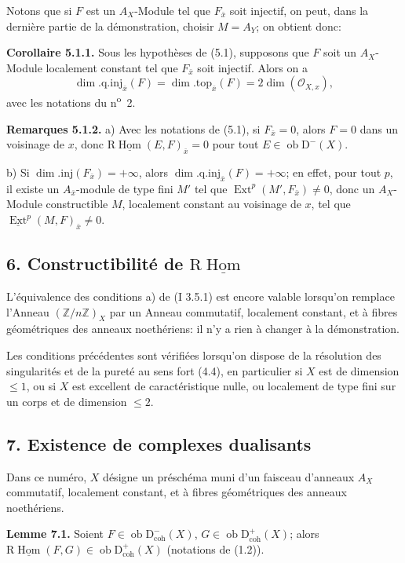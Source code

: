 \documentclass[11pt]{article}
\DeclareMathOperator{\Hom}{Hom}
\DeclareMathOperator{\Ext}{Ext}
\newcommand{\R}{\mathrm{R}}
\newcommand{\D}{\mathrm{D}}
\newcommand{\Z}{\mathbb{Z}}
\newcommand{\ob}{\operatorname{ob}}
\providecommand{\Hom}{\operatorname{Hom}}
\providecommand{\ob}{\operatorname{ob}}
\begin{document}
Notons que si $F$ est un $A_X$-Module tel que $F_{\bar{x}}$ soit injectif, on peut, dans la dernière partie de la démonstration, choisir $M=A_Y$; on obtient donc:

\textbf{Corollaire 5.1.1.} Sous les hypothèses de (5.1), supposons que $F$ soit un $A_X$-Module localement constant tel que $F_{\bar{x}}$ soit injectif. Alors on a
\[
        \dim.\mathrm{q.inj}_{\bar{x}}(F)=\dim.\mathrm{top}_{\bar{x}}(F)=2\dim(\mathcal{O}_{X,x}),
\]
avec les notations du n\textsuperscript{o}~2.

\textbf{Remarques 5.1.2.} a) Avec les notations de (5.1), si $F_{\bar{x}}=0$, alors $F=0$ dans un voisinage de $x$, donc $\R\underline{\Hom}(E,F)_{\bar{x}}=0$ pour tout $E\in\ob\D^{-}(X)$.

b) Si $\dim.\mathrm{inj}(F_{\bar{x}})=+\infty$, alors $\dim.\mathrm{q.inj}_{\bar{x}}(F)=+\infty$; en effet, pour tout $p$, il existe un $A_{\bar{x}}$-module de type fini $M'$ tel que $\Ext^p(M',F_{\bar{x}})\neq0$, donc un $A_X$-Module constructible $M$, localement constant au voisinage de $x$, tel que $\underline{\Ext}^p(M,F)_{\bar{x}}\neq0$.

\subsection*{6. Constructibilité de $\R\underline{\Hom}$}

L'équivalence des conditions a) de (I 3.5.1) est encore valable lorsqu'on remplace l'Anneau $(\Z/n\Z)_X$ par un Anneau commutatif, localement constant, et à fibres géométriques des anneaux noethériens: il n'y a rien à changer à la démonstration.

Les conditions précédentes sont vérifiées lorsqu'on dispose de la résolution des singularités et de la pureté au sens fort (4.4), en particulier si $X$ est de dimension $\leq1$, ou si $X$ est excellent de caractéristique nulle, ou localement de type fini sur un corps et de dimension $\leq2$.

\subsection*{7. Existence de complexes dualisants}

Dans ce numéro, $X$ désigne un préschéma muni d'un faisceau d'anneaux $A_X$ commutatif, localement constant, et à fibres géométriques des anneaux noethériens.

\textbf{Lemme 7.1.} Soient $F\in\ob\D^{-}_{\mathrm{coh}}(X)$, $G\in\ob\D^{+}_{\mathrm{coh}}(X)$; alors $\R\underline{\Hom}(F,G)\in\ob\D^{+}_{\mathrm{coh}}(X)$ (notations de (1.2)).
\end{document}
